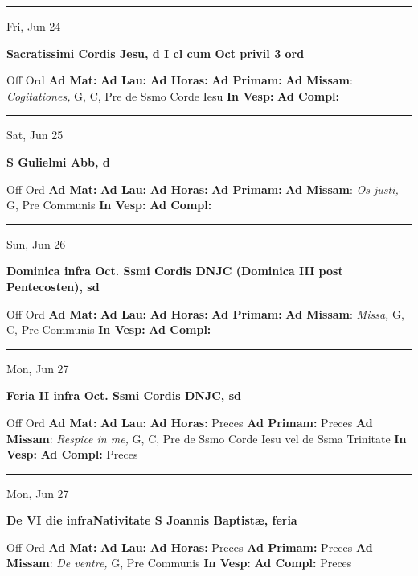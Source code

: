 \documentclass[letterpaper, 10pt]{article}
\begin{document}
\hrule
\begin{center}
Fri, Jun 24
\end{center}\textbf{ \large Sacratissimi Cordis Jesu, \textnormal{\normalsize d I cl cum Oct privil 3 ord}}
\begin{justify}
Off Ord
\textbf{Ad Mat: }
\textbf{Ad Lau: }
\textbf{Ad Horas: }
\textbf{Ad Primam: }
\textbf{Ad Missam}: \textit{Cogitationes,} G, C, Pre de Ssmo Corde Iesu
\textbf{In Vesp: }
\textbf{Ad Compl: }\end{justify}



\hrule
\begin{center}
Sat, Jun 25
\end{center}\textbf{ \large S Gulielmi Abb, \textnormal{\normalsize d}}
\begin{justify}
Off Ord
\textbf{Ad Mat: }
\textbf{Ad Lau: }
\textbf{Ad Horas: }
\textbf{Ad Primam: }
\textbf{Ad Missam}: \textit{Os justi,} G, Pre Communis
\textbf{In Vesp: }
\textbf{Ad Compl: }\end{justify}



\hrule
\begin{center}
Sun, Jun 26
\end{center}\textbf{ \large Dominica infra Oct. Ssmi Cordis DNJC (Dominica III post Pentecosten), \textnormal{\normalsize sd}}
\begin{justify}
Off Ord
\textbf{Ad Mat: }
\textbf{Ad Lau: }
\textbf{Ad Horas: }
\textbf{Ad Primam: }
\textbf{Ad Missam}: \textit{Missa,} G, C, Pre Communis
\textbf{In Vesp: }
\textbf{Ad Compl: }\end{justify}



\hrule
\begin{center}
Mon, Jun 27
\end{center}\textbf{ \large Feria II infra Oct. Ssmi Cordis DNJC, \textnormal{\normalsize sd}}
\begin{justify}
Off Ord
\textbf{Ad Mat: }
\textbf{Ad Lau: }
\textbf{Ad Horas: }Preces
\textbf{Ad Primam: }Preces
\textbf{Ad Missam}: \textit{Respice in me,} G, C, Pre de Ssmo Corde Iesu vel de Ssma Trinitate
\textbf{In Vesp: }
\textbf{Ad Compl: }Preces\end{justify}



\hrule
\begin{center}
Mon, Jun 27
\end{center}\textbf{ \large De VI die infraNativitate S Joannis Baptistæ, \textnormal{\normalsize feria}}
\begin{justify}
Off Ord
\textbf{Ad Mat: }
\textbf{Ad Lau: }
\textbf{Ad Horas: }Preces
\textbf{Ad Primam: }Preces
\textbf{Ad Missam}: \textit{De ventre,} G, Pre Communis
\textbf{In Vesp: }
\textbf{Ad Compl: }Preces\end{justify}
\end{document}
